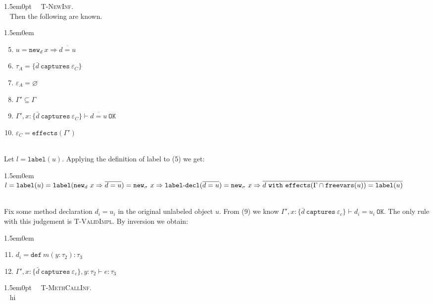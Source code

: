\documentclass{llncs}
\newcommand{\keywadj}[1]{\mathtt{#1}}
\newcommand{\keyw}[1]{\keywadj{#1}~}
\newcommand{\kw}[1]{\keyw{ #1 }}
\newcommand{\kwa}[1]{\keywadj{ #1 }}
\newcommand{\hyphen}{\hbox{-}}
\newcommand{\proofcase}[2]{
	\begin{adjustwidth}{1.5em}{0pt}
		\fbox{Case.}~~#1. \\ ~#2
	\end{adjustwidth}
}
\newcommand{\newd}[0]{
	\keywadj{new}_d~x \Rightarrow \overline{d = u}
}
\begin{document}
\proofcase{\textsc{T-NewInf}}{
Then the following are known.


\begin{adjustwidth}{1.5em}{0em}
\begin{enumerate}
  \setcounter{enumi}{4}
  \item $u = \newd$
  \item $\tau_A = \{ \bar d~\kw{captures} \varepsilon_C \}$
  \item $\varepsilon_A = \varnothing$
  \item $\Gamma' \subseteq \Gamma$
  \item $\Gamma', x : \{ \bar d~\kw{captures} \varepsilon_C \} \vdash \overline{d = u}~\kwa{OK}$
  \item $\varepsilon_C = \kwa{effects}(\Gamma')$
\end{enumerate}
\end{adjustwidth}

~\\
Let $l = \kwa{label}(u)$. Applying the definition of label to (5) we get:

\begin{adjustwidth}{1.5em}{0em}
$l = \kwa{label}(u) \\
= \kwa{label}(\newd) \\
= \kwa{new}_\sigma~x \Rightarrow \kwa{label \hyphen decl}(\overline{d = u}) \\
= \kwa{new}_\sigma~x \Rightarrow \overline{d~\kw{with} \kwa{effects}(\Gamma \cap \kwa{freevars}(u)) = \kwa{label}(u)}$
\end{adjustwidth}

\noindent
\\Fix some method declaration $d_i = u_i$ in the original unlabeled object $u$. From (9) we know $\Gamma', x : \{ \bar d~\kw{captures} \varepsilon_c \} \vdash d_i = u_i~\kwa{OK}$. The only rule with this judgement is \textsc{T-ValidImpl}. By inversion we obtain:
\begin{adjustwidth}{1.5em}{0em}
\begin{enumerate}
  \setcounter{enumi}{10}
  \item $d_i = \kw{def} m(y : \tau_2) : \tau_3$
  \item $\Gamma', x : \{ \bar d~\kw{captures} \varepsilon_c \}, y : \tau_2 \vdash e : \tau_3$
\end{enumerate}
\end{adjustwidth}


}

\proofcase{\textsc{T-MethCallInf}}{
hi\\
}
\end{document}
